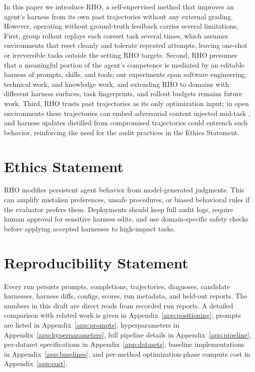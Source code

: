 \documentclass[11pt]{article}
\newcommand{\method}{\textsc{RHO}}
\begin{document}
In this paper we introduce \method{}, a self-supervised method that improves an agent's harness from its own past trajectories without any external grading.
However, operating without ground-truth feedback carries several limitations.
First, group rollout replays each coreset task several times, which assumes environments that reset cleanly and tolerate repeated attempts, leaving one-shot or irreversible tasks outside the setting \method{} targets.
Second, \method{} presumes that a meaningful portion of the agent's competence is mediated by an editable harness of prompts, skills, and tools; our experiments span software engineering, technical work, and knowledge work, and extending \method{} to domains with different harness surfaces, task fingerprints, and rollout budgets remains future work.
Third, \method{} trusts past trajectories as its only optimization input; in open environments these trajectories can embed adversarial content injected mid-task \citep{liu2026webtrap}, and harness updates distilled from compromised trajectories could entrench such behavior, reinforcing the need for the audit practices in the Ethics Statement.

\section*{Ethics Statement}

\method{} modifies persistent agent behavior from model-generated judgments.
This can amplify mistaken preferences, unsafe procedures, or biased behavioral rules if the evaluator prefers them.
Deployments should keep full audit logs, require human approval for sensitive harness edits, and use domain-specific safety checks before applying accepted harnesses to high-impact tasks.

\section*{Reproducibility Statement}

Every run persists prompts, completions, trajectories, diagnoses, candidate harnesses, harness diffs, configs, scores, run metadata, and held-out reports.
The numbers in this draft are direct reads from recorded run reports.
A detailed comparison with related work is given in Appendix~\ref{app:positioning}, prompts are listed in Appendix~\ref{app:prompts}, hyperparameters in Appendix~\ref{app:hyperparameters}, full pipeline details in Appendix~\ref{app:pipeline}, per-dataset specifications in Appendix~\ref{app:datasets}, baseline implementations in Appendix~\ref{app:baselines}, and per-method optimization-phase compute cost in Appendix~\ref{app:cost}.
\end{document}
